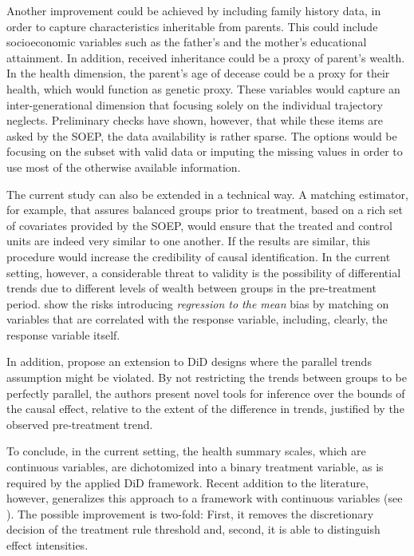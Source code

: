 Another improvement could be achieved by including family history data, in order to capture characteristics
inheritable from parents. This could include socioeconomic variables such as the father's and the mother's
educational attainment. In addition, received inheritance could be a proxy of parent's wealth. In the health
dimension, the parent's age of decease could be a proxy for their health, which would function as genetic proxy.
These variables would capture an inter-generational dimension that focusing solely on the individual trajectory
neglects. Preliminary checks have shown, however, that while these items are asked by the SOEP, the data availability
is rather sparse. The options would be focusing on the subset with valid data or imputing the missing values in
order to use most of the otherwise available information.

The current study can also be extended in a technical way. A matching estimator, for example, that assures balanced
groups prior to treatment, based on a rich set of covariates provided by the SOEP, would ensure that the treated
and control units are indeed very similar to one another. If the results are similar, this procedure would increase
the credibility of causal identification. In the current setting, however, a considerable threat to validity is the
possibility of differential trends due to different levels of wealth between groups in the pre-treatment period.
\textcite{daw.hatfield2018matching} show the risks introducing \textit{regression to the mean} bias by matching on
variables that are correlated with the response variable, including, clearly, the response variable itself.

In addition, \textcite{rambachan.roth2023more} propose an extension to DiD designs where the parallel trends
assumption might be violated. By not restricting the trends between groups to be perfectly parallel, the
authors present novel tools for inference over the bounds of the causal effect, relative to the extent of the
difference in trends, justified by the observed pre-treatment trend.


To conclude, in the current setting, the health summary scales, which are continuous variables, are dichotomized
into a binary treatment variable, as is required by the applied DiD framework. Recent addition to the
literature, however, generalizes this approach to a framework with continuous variables (see
\cite{callaway.etal2024eventstudies}). The possible improvement is two-fold: First, it removes the
discretionary decision of the treatment rule threshold and, second, it is able to distinguish effect intensities. 



